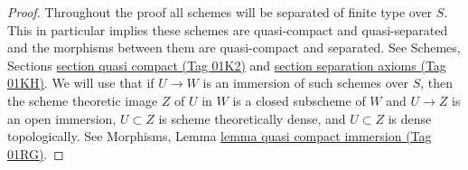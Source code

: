 \documentclass{amsart}
\theoremstyle{plain}
\theoremstyle{definition}
\theoremstyle{remark}
\numberwithin{equation}{subsection}
\begin{document}
\begin{proof}
Throughout the proof all schemes will be separated of finite type over $S$.
This in particular implies these schemes are quasi-compact and quasi-separated
and the morphisms between them are quasi-compact and separated.
See Schemes, Sections \href{https://stacks.math.columbia.edu/tag/01K2}{section quasi compact (Tag 01K2)} and
\href{https://stacks.math.columbia.edu/tag/01KH}{section separation axioms (Tag 01KH)}.
We will use that if $U \to W$ is an immersion of such schemes over $S$,
then the scheme theoretic image $Z$ of $U$ in $W$ is a closed subscheme
of $W$ and $U \to Z$ is an open immersion, $U \subset Z$ is scheme
theoretically dense, and $U \subset Z$ is dense topologically. See
Morphisms, Lemma
\href{https://stacks.math.columbia.edu/tag/01RG}{lemma quasi compact immersion (Tag 01RG)}.


\end{proof}
\end{document}

